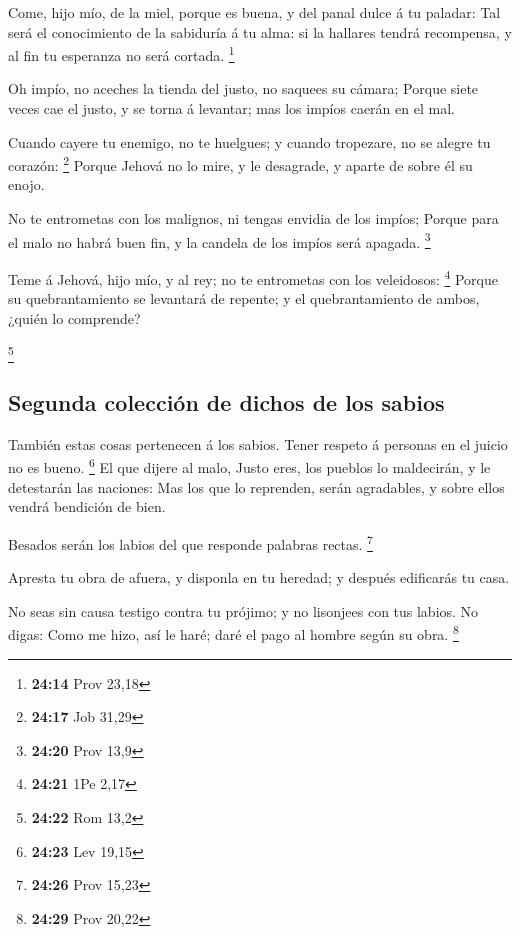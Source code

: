  Come, hijo mío, de la miel, porque es buena, y del panal
dulce á tu paladar:  Tal será el conocimiento de la
sabiduría á tu alma: si la hallares tendrá recompensa, y al fin tu
esperanza no será cortada. \footnote{\textbf{24:14} Prov 23,18}

 Oh impío, no aceches la tienda del justo, no saquees su
cámara;  Porque siete veces cae el justo, y se torna á
levantar; mas los impíos caerán en el mal.

 Cuando cayere tu enemigo, no te huelgues; y cuando
tropezare, no se alegre tu corazón: \footnote{\textbf{24:17} Job 31,29}
 Porque Jehová no lo mire, y le desagrade, y aparte de
sobre él su enojo.

 No te entrometas con los malignos, ni tengas envidia de
los impíos;  Porque para el malo no habrá buen fin, y la
candela de los impíos será apagada. \footnote{\textbf{24:20} Prov 13,9}

 Teme á Jehová, hijo mío, y al rey; no te entrometas con
los veleidosos: \footnote{\textbf{24:21} 1Pe 2,17}  Porque
su quebrantamiento se levantará de repente; y el quebrantamiento de
ambos, ¿quién lo comprende?

\footnote{\textbf{24:22} Rom 13,2}

\hypertarget{segunda-colecciuxf3n-de-dichos-de-los-sabios}{%
\subsection{Segunda colección de dichos de los
sabios}\label{segunda-colecciuxf3n-de-dichos-de-los-sabios}}

 También estas cosas pertenecen á los sabios. Tener respeto
á personas en el juicio no es bueno. \footnote{\textbf{24:23} Lev 19,15}
 El que dijere al malo, Justo eres, los pueblos lo
maldecirán, y le detestarán las naciones:  Mas los que lo
reprenden, serán agradables, y sobre ellos vendrá bendición de bien.

 Besados serán los labios del que responde palabras rectas.
\footnote{\textbf{24:26} Prov 15,23}

 Apresta tu obra de afuera, y disponla en tu heredad; y
después edificarás tu casa.

 No seas sin causa testigo contra tu prójimo; y no
lisonjees con tus labios.  No digas: Como me hizo, así le
haré; daré el pago al hombre según su obra. \footnote{\textbf{24:29}
  Prov 20,22}

